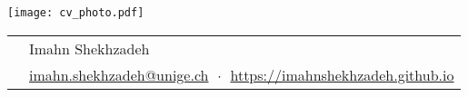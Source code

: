 \documentclass[11pt, a4paper]{article}
\newcommand{\headingfont}{\Large\color{OliveGreen}}
\newenvironment{SectionTable}[1]{
	\renewcommand*{\arraystretch}{1.7}
	\setlength{\tabcolsep}{10pt}
	\begin{longtable}{Rp{5.2in}} & #1 \\}
	{\end{longtable}\vspace{-.3cm}}
\begin{document}
	
	
	\hspace{0.5cm}
	\begin{minipage}{0.1\textwidth}
		\vspace{0.6cm}
		\texttt{[image: cv\_photo.pdf]}
	\end{minipage}
	\hspace{-2.9cm}
	\begin{minipage}{0.9\textwidth}
		\begin{SectionTable}{\Huge Imahn Shekhzadeh} & 
			\href{mailto:imahn.shekhzadeh@unige.ch}{imahn.shekhzadeh@unige.ch} $\;\boldsymbol{\cdot}\;$ \href{https://imahnshekhzadeh.github.io}{https://imahnshekhzadeh.github.io}
		\end{SectionTable}
	\end{minipage}
	
	
	
	
\end{document}
